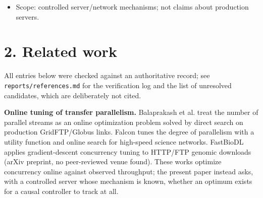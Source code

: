 \documentclass[conference]{IEEEtran}
\begin{document}
\begin{itemize}
\begin{enumerate}
\item Existence results for adaptive (N,S) selection/control \textbf{under an explicitly constructed N-dependent server model} (§6, §7): within-download improvement over the best stationary configuration (\textbf{Confirmed}, n=10 blocks); cross-workload selection (\textbf{Descriptive}; consistency across the family not established).
\item An engine ablation showing that a whole-request timeout and missing straggler splitting, not control, explained aria2's lead under the cap, after which the best fixed configuration beat the adaptive controllers (\textbf{Confirmed}, §7a); and a live-rate control server showing that the large-range advantage depends on the server fixing a response's rate on arrival (§9c).
\item An inventory of learned-policy experiments (§9): the early candidates are negative or descriptive; agents retrained for the capped server beat the fixed configuration with their own range size where trained, generalized partially inside a broadened training envelope, and failed a no-harm check on public mirrors (§8a).
\end{enumerate}
\item Scope: controlled server/network mechanisms; not claims about production servers.
\end{itemize}

\section*{2. Related work}

All entries below were checked against an authoritative record; see \texttt{reports/\allowbreak{}references.md} for the verification log and the list of unresolved candidates, which are deliberately not cited.


\textbf{Online tuning of transfer parallelism.} Balaprakash et al. \cite{balaprakash2016direct} treat the number of parallel streams as an online optimization problem solved by direct search on production GridFTP/Globus links. Falcon \cite{arifuzzaman2023falcon,arifuzzaman2021online} tunes the degree of parallelism with a utility function and online search for high-speed science networks. FastBioDL \cite{swargo2025fastbiodl} applies gradient-descent concurrency tuning to HTTP/FTP genomic downloads (arXiv preprint, no peer-reviewed venue found). These works optimize concurrency online against observed throughput; the present paper instead asks, with a controlled server whose mechanism is known, whether an optimum exists for a causal controller to track at all.
\end{document}

